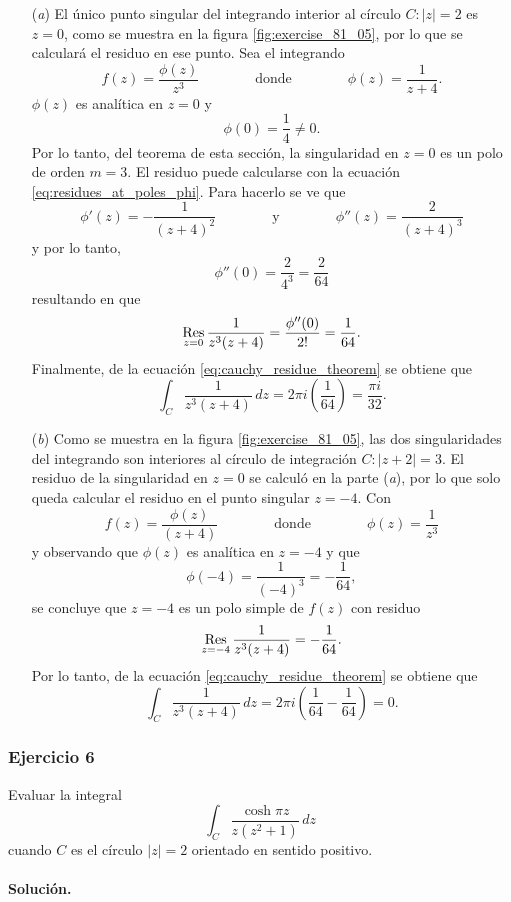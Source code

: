\documentclass[a4paper]{report}
\def\Res{\qopname\relax m{Res}}
\begin{document}
\begin{enumerate}
 \item[(\textit{a})] El único punto singular del integrando interior al círculo \(C:|z|=2\) es \(z=0\), como se muestra en la figura \ref{fig:exercise_81_05}, por lo que se calculará el residuo en ese punto. Sea el integrando
 \[
  f(z)=\frac{\phi(z)}{z^3}
  \qquad\qquad\textrm{donde}\qquad\qquad
  \phi(z)=\frac{1}{z+4}.
 \]
 \(\phi(z)\) es analítica en \(z=0\) y 
 \[
  \phi(0)=\frac{1}{4}\neq0.
 \]
 Por lo tanto, del teorema de esta sección, la singularidad en \(z=0\) es un polo de orden \(m=3\). El residuo puede calcularse con la ecuación \ref{eq:residues_at_poles_phi}. Para hacerlo se ve que 
 \[
  \phi'(z)=-\frac{1}{(z+4)^2}
  \qquad\qquad\textrm{y}\qquad\qquad
  \phi''(z)=\frac{2}{(z+4)^3}
 \]
 y por lo tanto,
 \[
  \phi''(0)=\frac{2}{4^3}=\frac{2}{64}
 \]
 resultando en que 
 \[
  \Res_{z=0}\frac{1}{z^3(z+4)}=\frac{\phi''(0)}{2!}=\frac{1}{64}.
 \]
 Finalmente, de la ecuación \ref{eq:cauchy_residue_theorem} se obtiene que 
 \[
  \int_C\frac{1}{z^3(z+4)}\,dz=2\pi i\left(\frac{1}{64}\right)=\frac{\pi i}{32}.
 \] 
 \item[(\textit{b})] Como se muestra en la figura \ref{fig:exercise_81_05}, las dos singularidades del integrando son interiores al círculo de integración \(C:|z+2|=3\). El residuo de la singularidad en \(z=0\) se calculó en la parte (\textit{a}), por lo que solo queda calcular el residuo en el punto singular \(z=-4\). Con 
 \[
  f(z)=\frac{\phi(z)}{(z+4)}
  \qquad\qquad\textrm{donde}\qquad\qquad
  \phi(z)=\frac{1}{z^3}
 \]
 y observando que \(\phi(z)\) es analítica en \(z=-4\) y que 
 \[
  \phi(-4)=\frac{1}{(-4)^3}=-\frac{1}{64},
 \]
 se concluye que \(z=-4\) es un polo simple de \(f(z)\) con residuo
 \[
  \Res_{z=-4}\frac{1}{z^3(z+4)}=-\frac{1}{64}.
 \]
 Por lo tanto, de la ecuación \ref{eq:cauchy_residue_theorem} se obtiene que 
 \[
  \int_C\frac{1}{z^3(z+4)}\,dz=2\pi i\left(\frac{1}{64}-\frac{1}{64}\right)=0.
 \]
\end{enumerate} 
 
\subsubsection*{Ejercicio 6}

Evaluar la integral
\[
 \int_C\frac{\cosh\pi z}{z(z^2+1)}\,dz
\]
cuando \(C\) es el círculo \(|z|=2\) orientado en sentido positivo. 

\paragraph{Solución.}
\end{document}
